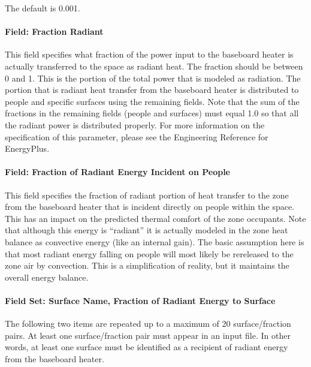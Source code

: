 The default is 0.001.

\paragraph{Field: Fraction Radiant}\label{field-fraction-radiant-000}

This field specifies what fraction of the power input to the baseboard heater is actually transferred to the space as radiant heat. The fraction should be between 0 and 1. This is the portion of the total power that is modeled as radiation. The portion that is radiant heat transfer from the baseboard heater is distributed to people and specific surfaces using the remaining fields. Note that the sum of the fractions in the remaining fields (people and surfaces) must equal 1.0 so that all the radiant power is distributed properly. For more information on the specification of this parameter, please see the Engineering Reference for EnergyPlus.

\paragraph{Field: Fraction of Radiant Energy Incident on People}\label{field-fraction-of-radiant-energy-incident-on-people}

This field specifies the fraction of radiant portion of heat transfer to the zone from the baseboard heater that is incident directly on people within the space. This has an impact on the predicted thermal comfort of the zone occupants. Note that although this energy is ``radiant'' it is actually modeled in the zone heat balance as convective energy (like an internal gain). The basic assumption here is that most radiant energy falling on people will most likely be rereleased to the zone air by convection. This is a simplification of reality, but it maintains the overall energy balance.

\paragraph{Field Set: Surface Name, Fraction of Radiant Energy to Surface}\label{field-set-surface-name-fraction-of-radiant-energy-to-surface}

The following two items are repeated up to a maximum of 20 surface/fraction pairs. At least one surface/fraction pair must appear in an input file. In other words, at least one surface must be identified as a recipient of radiant energy from the baseboard heater.

